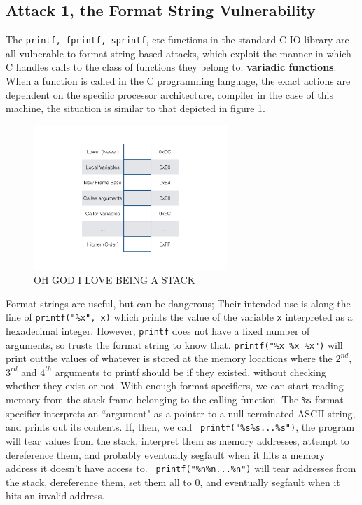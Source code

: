 \subsection{Attack 1, the Format String Vulnerability}

The {\tt printf, fprintf, sprintf}, etc functions in the standard C IO library are all vulnerable to format string based
attacks, which exploit the manner in which C handles calls to the class of functions they belong to: \textbf{variadic
functions}\cite{vfunc}. When a function is called in the C programming language,\cite{call_conv}
the exact actions are dependent on the specific processor architecture, compiler
in the case of this machine, the situation is similar to that depicted in figure \ref{fig_stack}.

\begin{figure}[ht] \centering \includegraphics[width = 0.65\textwidth]{./images/stack.jpg} \caption{OH GOD I LOVE BEING
A STACK} \label{fig_stack} \end{figure}

Format strings are useful, but can be dangerous; Their intended use is along the line of {\tt printf("\%x", x)} which
prints the value of the variable {\tt x} interpreted as a hexadecimal integer. However, {\tt printf} does not have a
fixed number of arguments, so trusts the format string to know that. {\tt printf("\%x \%x \%x")} will print outthe
values of whatever is stored at the memory locations where the $2^{nd}$, $3^{rd}$ and $4^{th}$ arguments to printf
should be if they existed, without checking whether they exist or not. With enough format specifiers, we can start
reading memory from the stack frame belonging to the calling function. The {\tt \%s} format specifier interprets an
``argument" as a pointer to a null-terminated ASCII string, and prints out its contents. If, then, we call {\tt
printf("\%s\%s...\%s")}, the program will tear values from the stack, interpret them as memory addresses, attempt to
dereference them, and probably eventually segfault when it hits a memory address it doesn't have access to. {\tt
printf("\%n\%n...\%n")} will tear addresses from the stack, dereference them, set them all to 0, and eventually segfault
when it hits an invalid address.

